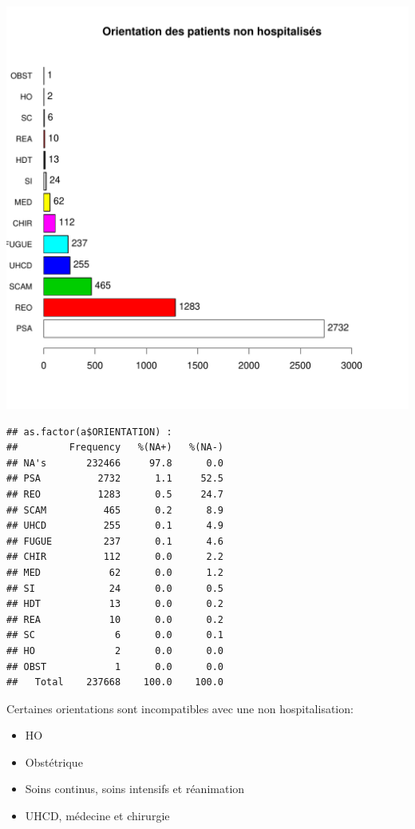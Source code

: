 \documentclass[12pt,english,french,twoside]{report}\usepackage[]{graphicx}\usepackage[]{color}
\makeatletter
\def\maxwidth{ %
  \ifdim\Gin@nat@width>\linewidth
    \linewidth
  \else
    \Gin@nat@width
  \fi
}
\newenvironment{kframe}{%
 \def\at@end@of@kframe{}%
 \ifinner\ifhmode%
  \def\at@end@of@kframe{\end{minipage}}%
  \begin{minipage}{\columnwidth}%
 \fi\fi%
 \def\FrameCommand##1{\hskip\@totalleftmargin \hskip-\fboxsep
 \colorbox{shadecolor}{##1}\hskip-\fboxsep
     \hskip-\linewidth \hskip-\@totalleftmargin \hskip\columnwidth}%
 \MakeFramed {\advance\hsize-\width
   \@totalleftmargin\z@ \linewidth\hsize
   \@setminipage}}%
 {\par\unskip\endMakeFramed%
 \at@end@of@kframe}
\newenvironment{knitrout}{}{} %
\makeatother
\begin{document}
\begin{knitrout}
\includegraphics[width=\maxwidth]{figure/fausses_sorties} 
\begin{kframe}\begin{verbatim}
## as.factor(a$ORIENTATION) : 
##         Frequency   %(NA+)   %(NA-)
## NA's       232466     97.8      0.0
## PSA          2732      1.1     52.5
## REO          1283      0.5     24.7
## SCAM          465      0.2      8.9
## UHCD          255      0.1      4.9
## FUGUE         237      0.1      4.6
## CHIR          112      0.0      2.2
## MED            62      0.0      1.2
## SI             24      0.0      0.5
## HDT            13      0.0      0.2
## REA            10      0.0      0.2
## SC              6      0.0      0.1
## HO              2      0.0      0.0
## OBST            1      0.0      0.0
##   Total    237668    100.0    100.0
\end{verbatim}
\end{kframe}
\end{knitrout}

Certaines orientations sont incompatibles avec une non hospitalisation:
\begin{itemize}
  \item HO
  \item Obstétrique
  \item Soins continus, soins intensifs et réanimation
  \item UHCD, médecine et chirurgie
  
\end{itemize}
\end{document}
